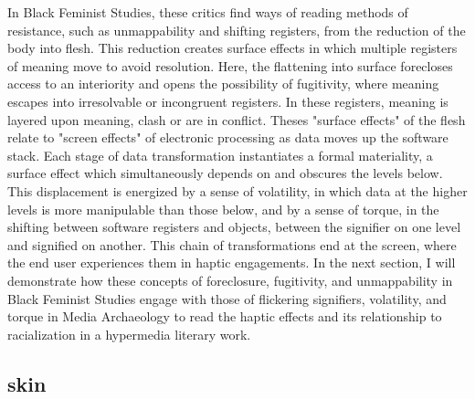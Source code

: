 \documentclass[11pt]{article}
\begin{document}
In Black Feminist Studies, these critics find ways of reading methods
of resistance, such as unmappability and shifting registers, from the
reduction of the body into flesh. This reduction creates surface
effects in which multiple registers of meaning move to avoid
resolution. Here, the flattening into surface forecloses access to an
interiority and opens the possibility of fugitivity, where meaning
escapes into irresolvable or incongruent registers. In these
registers, meaning is layered upon meaning, clash or are in
conflict. Theses "surface effects" of the flesh relate to "screen
effects" of electronic processing as data moves up the software
stack. Each stage of data transformation instantiates a formal
materiality, a surface effect which simultaneously depends on and
obscures the levels below. This displacement is energized by a sense
of volatility, in which data at the higher levels is more manipulable
than those below, and by a sense of torque, in the shifting between
software registers and objects, between the signifier on one level and
signified on another. This chain of transformations end at the screen,
where the end user experiences them in haptic engagements. In the next
section, I will demonstrate how these concepts of foreclosure,
fugitivity, and unmappability in Black Feminist Studies engage with
those of flickering signifiers, volatility, and torque in Media
Archaeology to read the haptic effects and its relationship to
racialization in a hypermedia literary work.


\subsection{skin}
\label{sec:orge98e4d6}
\end{document}
